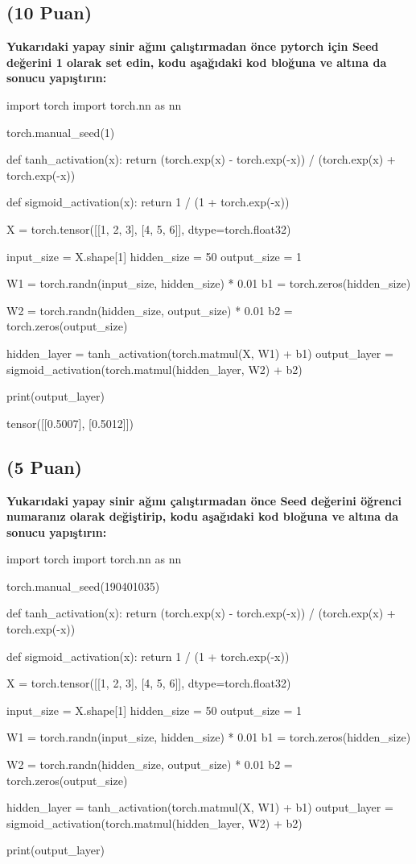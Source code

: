 \documentclass[11pt]{article}
\begin{document}
\subsection{(10 Puan)} \textbf{Yukarıdaki yapay sinir ağını çalıştırmadan önce pytorch için Seed değerini 1 olarak set edin, kodu aşağıdaki kod bloğuna ve altına da sonucu yapıştırın:}

\begin{python}
import torch
import torch.nn as nn

torch.manual_seed(1)

def tanh_activation(x):
    return (torch.exp(x) - torch.exp(-x)) / (torch.exp(x) + torch.exp(-x))

def sigmoid_activation(x):
    return 1 / (1 + torch.exp(-x))

X = torch.tensor([[1, 2, 3], [4, 5, 6]], dtype=torch.float32)

input_size = X.shape[1]
hidden_size = 50
output_size = 1

W1 = torch.randn(input_size, hidden_size) * 0.01
b1 = torch.zeros(hidden_size)

W2 = torch.randn(hidden_size, output_size) * 0.01
b2 = torch.zeros(output_size)

hidden_layer = tanh_activation(torch.matmul(X, W1) + b1)
output_layer = sigmoid_activation(torch.matmul(hidden_layer, W2) + b2)

print(output_layer)
\end{python}

tensor([[0.5007],
        [0.5012]])

\subsection{(5 Puan)} \textbf{Yukarıdaki yapay sinir ağını çalıştırmadan önce Seed değerini öğrenci numaranız olarak değiştirip, kodu aşağıdaki kod bloğuna ve altına da sonucu yapıştırın:}

\begin{python}
import torch
import torch.nn as nn

torch.manual_seed(190401035)

def tanh_activation(x):
    return (torch.exp(x) - torch.exp(-x)) / (torch.exp(x) + torch.exp(-x))

def sigmoid_activation(x):
    return 1 / (1 + torch.exp(-x))

X = torch.tensor([[1, 2, 3], [4, 5, 6]], dtype=torch.float32)

input_size = X.shape[1]
hidden_size = 50
output_size = 1

W1 = torch.randn(input_size, hidden_size) * 0.01
b1 = torch.zeros(hidden_size)

W2 = torch.randn(hidden_size, output_size) * 0.01
b2 = torch.zeros(output_size)

hidden_layer = tanh_activation(torch.matmul(X, W1) + b1)
output_layer = sigmoid_activation(torch.matmul(hidden_layer, W2) + b2)

print(output_layer)
\end{python}
\end{document}
